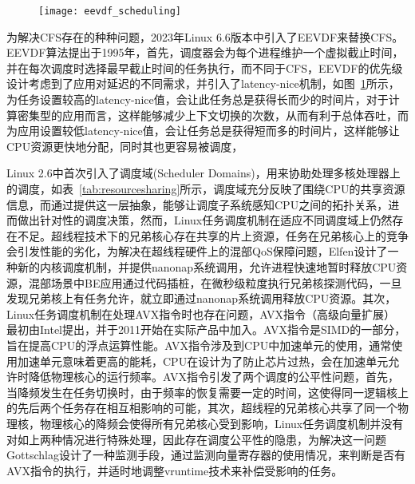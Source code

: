\begin{figure}[!htbp]
    \centering
    \texttt{[image: eevdf\_scheduling]}
    \label{fig:eevdf_scheduling}
\end{figure}

为解决CFS存在的种种问题，2023年Linux 6.6版本中引入了EEVDF来替换CFS。EEVDF算法\citep{stoica1995earliest}提出于1995年，首先，调度器会为每个进程维护一个虚拟截止时间，并在每次调度时选择最早截止时间的任务执行，而不同于CFS，EEVDF的优先级设计考虑到了应用对延迟的不同需求，并引入了latency-nice机制，如图~\ref{fig:eevdf_scheduling}所示，为任务设置较高的latency-nice值，会让此任务总是获得长而少的时间片，对于计算密集型的应用而言，这样能够减少上下文切换的次数，从而有利于总体吞吐，而为应用设置较低latency-nice值，会让任务总是获得短而多的时间片，这样能够让CPU资源更快地分配，同时其也更容易被调度，

Linux 2.6中首次引入了调度域(Scheduler Domains)\citep{schedulerdomains}，用来协助处理多核处理器上的调度，如表~\ref{tab:resourcesharing}所示，调度域充分反映了围绕CPU的共享资源信息，而通过提供这一层抽象，能够让调度子系统感知CPU之间的拓扑关系，进而做出针对性的调度决策，然而，Linux任务调度机制在适应不同调度域上仍然存在不足。超线程技术下的兄弟核心存在共享的片上资源，任务在兄弟核心上的竞争会引发性能的劣化，为解决在超线程硬件上的混部QoS保障问题，Elfen\citep{yang2016elfen}设计了一种新的内核调度机制，并提供nanonap系统调用，允许进程快速地暂时释放CPU资源，混部场景中BE应用通过代码插桩，在微秒级粒度执行兄弟核探测代码，一旦发现兄弟核上有任务允许，就立即通过nanonap系统调用释放CPU资源。其次，Linux任务调度机制在处理AVX指令时也存在问题，AVX指令（高级向量扩展）\citep{guide2011intel} 最初由Intel提出，并于2011开始在实际产品中加入。AVX指令是SIMD的一部分，旨在提高CPU的浮点运算性能。AVX指令涉及到CPU中加速单元的使用，通常使用加速单元意味着更高的能耗，CPU在设计为了防止芯片过热，会在加速单元允许时降低物理核心的运行频率。AVX指令引发了两个调度的公平性问题，首先，当降频发生在任务切换时，由于频率的恢复需要一定的时间，这使得同一逻辑核上的先后两个任务存在相互相影响的可能，其次，超线程的兄弟核心共享了同一个物理核，物理核心的降频会使得所有兄弟核心受到影响，Linux任务调度机制并没有对如上两种情况进行特殊处理，因此存在调度公平性的隐患，为解决这一问题Gottschlag\citep{gottschlag2020avx}设计了一种监测手段，通过监测向量寄存器的使用情况，来判断是否有AVX指令的执行，并适时地调整vruntime技术来补偿受影响的任务。


